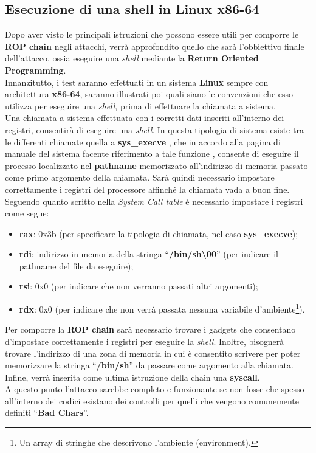 \subsection*{Esecuzione di una shell in Linux x86-64}
\label{subsec:Shell}
Dopo aver visto le principali istruzioni che possono essere utili per comporre le \textbf{ROP chain} negli attacchi, verrà approfondito quello che sarà l'obbiettivo finale dell'attacco, ossia eseguire una \textit{shell} mediante la \textbf{Return Oriented Programming}.\\
Innanzitutto, i test saranno effettuati in un sistema \textbf{Linux} sempre con architettura \textbf{x86-64}, saranno illustrati poi quali siano le convenzioni che esso utilizza per eseguire una \textit{shell}, prima di effettuare la chiamata a sistema.\\
Una chiamata a sistema effettuata con i corretti dati inseriti all'interno dei registri, consentirà di eseguire una \textit{shell}. In questa tipologia di sistema esiste tra le differenti chiamate quella a \textbf{sys\_execve} \cite*{Syscall-table}\cite*{Syscall-table-UP}, che in accordo 
alla pagina di manuale del sistema facente riferimento a tale funzione \cite*{Execve-linuxmanpage}, consente di eseguire il processo localizzato nel \textbf{pathname} memorizzato all'indirizzo di memoria passato come primo argomento della chiamata. Sarà quindi necessario impostare correttamente 
i registri del processore affinché la chiamata vada a buon fine. Seguendo quanto scritto nella \textit{System Call table} \cite*{Syscall-table} è necessario impostare i registri come segue:  
\label{shell-reg}
\begin{itemize}
    \item \textbf{rax}: 0x3b (per specificare la tipologia di chiamata, nel caso \textbf{sys\_execve});
    \item \textbf{rdi}: indirizzo in memoria della stringa ``\textbf{/bin/sh\textbackslash00}'' \space (per indicare il pathname del file da eseguire);
    \item \textbf{rsi}: 0x0 (per indicare che non verranno passati altri argomenti);
    \item \textbf{rdx}: 0x0 (per indicare che non verrà passata nessuna variabile d'ambiente\footnote[1]{Un array di stringhe che descrivono l'ambiente (environment).}).
\end{itemize}

Per comporre la \textbf{ROP chain} sarà necessario trovare i gadgets che consentano d'impostare correttamente i registri per eseguire la \textit{shell}. Inoltre, bisognerà trovare l'indirizzo di una zona di memoria in cui è consentito scrivere per poter memorizzare la stringa 
``\textbf{/bin/sh}'' da passare come argomento alla chiamata. Infine, verrà inserita come ultima istruzione della chain una \textbf{syscall}.\\
A questo punto l'attacco sarebbe completo e funzionante se non fosse che spesso all'interno dei codici esistano dei controlli per quelli che vengono comunemente definiti ``\textbf{Bad Chars}''.


